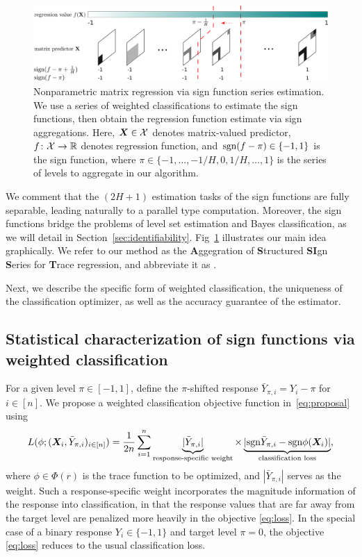 \documentclass[11pt]{article}
\newcommand*{\KeepStyleUnderBrace}[1]{%
\mathop{%
\mathchoice
{\underbrace{\displaystyle#1}}%
{\underbrace{\textstyle#1}}%
{\underbrace{\scriptstyle#1}}%
{\underbrace{\scriptscriptstyle#1}}%
}\limits
}
\theoremstyle{plain}
\theoremstyle{definition}
\def\sign{\textup{sgn}}
\def\NonparaM{\text{\bf \footnotesize ASSIST}}
\begin{document}
\begin{figure}[t]
\includegraphics[width=\textwidth]{figure/demo_method.pdf}
\caption{Nonparametric matrix regression via sign function series estimation. We use a series of weighted classifications to estimate the sign functions, then obtain the regression function estimate via sign aggregations. Here, $\bm X\in\mathcal{X}$ denotes matrix-valued predictor, $f\colon \mathcal{X}\to \mathbb{R}$ denotes regression function, and $\sign(f-\pi)\in\{-1,1\}$ is the sign function, where $\pi\in\{-1,\ldots,-1/H,0,1/H,\ldots, 1\}$ is the series of levels to aggregate in our algorithm.}
\label{fig:method}
\end{figure}

We comment that the $(2H+1)$ estimation tasks of the sign functions are fully separable, leading naturally to a parallel type computation. Moreover, the sign functions bridge the problems of level set estimation and Bayes classification, as we will detail in Section~\ref{sec:identifiability}. Fig~\ref{fig:method} illustrates our main idea graphically. We refer to our method as the {\bf \small A}ggegration of {\bf \small S}tructured {\bf \small SI}gn {\bf \small S}eries for {\bf \small T}race regression, and abbreviate it as \NonparaM.

Next, we describe the specific form of weighted classification, the uniqueness of the classification optimizer, as well as the accuracy guarantee of the estimator. 



\subsection{Statistical characterization of sign functions via weighted classification}

For a given level $\pi\in[-1,1]$, define the $\pi$-shifted response $\bar Y_{\pi,i} =Y_i-\pi$ for $i\in[n]$. We propose a weighted classification objective function in~\eqref{eq:proposal} using 
\begin{equation}\label{eq:loss}
L(\phi;(\mX_i,\bar Y_{\pi,i})_{i\in[n]})={1\over 2n}\sum_{i=1}^n\KeepStyleUnderBrace{|\bar Y_{\pi,i}|}_{\text{response-specific weight}}\times\KeepStyleUnderBrace{|\sign \bar Y_{\pi,i} - \sign \phi(\mX_i)|}_{\text{classification loss}},
\end{equation}
where $\phi\in \Phi(r)$ is the trace function to be optimized, and $|\bar Y_{\pi, i}|$ serves as the weight. Such a response-specific weight incorporates the magnitude information of the response into classification, in that the response values that are far away from the target level are penalized more heavily in the objective \eqref{eq:loss}. In the special case of a binary response $Y_i\in\{-1,1\}$ and target level $\pi=0$, the objective \eqref{eq:loss} reduces to the usual classification loss. 
\end{document}
